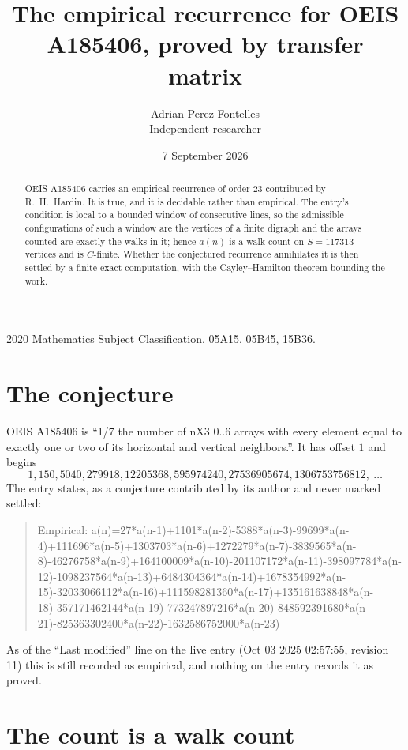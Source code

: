 \documentclass[11pt,a4paper]{article}
\title{The empirical recurrence for OEIS A185406, proved by transfer matrix}
\author{Adrian Perez Fontelles\\ \small Independent researcher}
\date{7 September 2026}
\theoremstyle{plain}
\theoremstyle{definition}
\begin{document}
\maketitle

\begin{abstract}
OEIS A185406 carries an empirical recurrence of order $23$ contributed by R.~H.~Hardin. It is
true, and it is decidable rather than empirical. The entry's condition is local to a bounded window of consecutive lines, so
the admissible configurations of such a window are the vertices of a finite digraph and the
arrays counted are exactly the walks in it; hence $a(n)$ is a walk count on $S=117313$ vertices
and is $C$-finite. Whether the conjectured recurrence annihilates it is then settled by a
finite exact computation, with the Cayley--Hamilton theorem bounding the work.
\end{abstract}

\noindent\small 2020 Mathematics Subject Classification. 05A15, 05B45, 15B36.\normalsize

\section{The conjecture}

OEIS A185406 is ``1/7 the number of nX3 0..6 arrays with every element equal to exactly one or two of its horizontal and vertical neighbors.''. It has offset $1$ and begins
\[
1, 150, 5040, 279918, 12205368, 595974240, 27536905674, 1306753756812,\ \dots
\]
The entry states, as a conjecture contributed by its author and never marked settled:
\begin{quote}
Empirical: a(n)=27*a(n-1)+1101*a(n-2)-5388*a(n-3)-99699*a(n-4)+111696*a(n-5)+1303703*a(n-6)+1272279*a(n-7)-3839565*a(n-8)-46276758*a(n-9)+164100009*a(n-10)-201107172*a(n-11)-398097784*a(n-12)-1098237564*a(n-13)+6484304364*a(n-14)+1678354992*a(n-15)-32033066112*a(n-16)+111598281360*a(n-17)+135161638848*a(n-18)-357171462144*a(n-19)-773247897216*a(n-20)-848592391680*a(n-21)-825363302400*a(n-22)-1632586752000*a(n-23)
\end{quote}
As of the ``Last modified'' line on the live entry (Oct 03 2025 02:57:55, revision 11) this is still
recorded as empirical, and nothing on the entry records it as proved.

\section{The count is a walk count}
\end{document}
